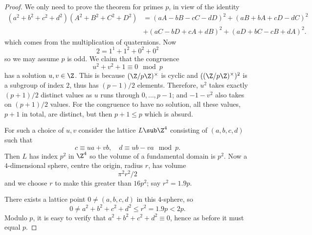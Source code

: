 \begin{proof}
We only need to prove the theorem for primes $p$, in view of the identity
\begin{align*}
(a^2+b^2+c^2+d^2)(A^2+B^2+C^2+D^2)&=(aA-bB-cC-dD)^2+(aB+bA+cD-dC)^2\\
&+(aC-bD+cA+dB)^2+(aD+bC-cB+dA)^2.
\end{align*}
which comes from the multiplication of quaternions. Now
\[2=1^1+1^2+0^2+0^2\]
so we may assume $p$ is odd. We claim that the congruence
\[u^2+v^2+1\equiv 0\mod p\]
has a solution $u,v\in\Z$. This is because $(\Z/p\Z)^{\times}$ is cyclic and $((\Z/p\Z)^{\times})^2$ is a subgroup of index $2$, thus has $(p-1)/2$ elements. Therefore, $u^2$ takes exactly $(p+1)/2$ distinct values as $u$ runs through $0,\dots,p-1$; and $-1-v^2$ also takes on $(p+1)/2$ values. For the congruence to have no solution, all these values, $p+1$ in total, are distinct, but then $p+1\leq p$ which is absurd.\par
For such a choice of $u,v$ consider the lattice $L\sub\Z^4$ consisting of $(a,b,c,d)$ such that
\[c\equiv ua+vb,\quad d\equiv ub-va\mod p.\]
Then $L$ has index $p^2$ in $\Z^4$ so the volume of a fundamental domain is $p^2$. Now a $4$-dimensional sphere, centre the origin, radius $r$, has volume
\[\pi^2r^2/2\]
and we choose $r$ to make this greater than $16p^2$; say $r^2=1.9p$.\par
There exists a lattice point $0\neq(a,b,c,d)$ in this $4$-sphere, so
\[0\neq a^2+b^2+c^2+d^2\leq r^2=1.9p<2p.\]
Modulo $p$, it is easy to verify that $a^2+b^2+c^2+d^2\equiv0$, hence as before it must equal $p$.
\end{proof}
